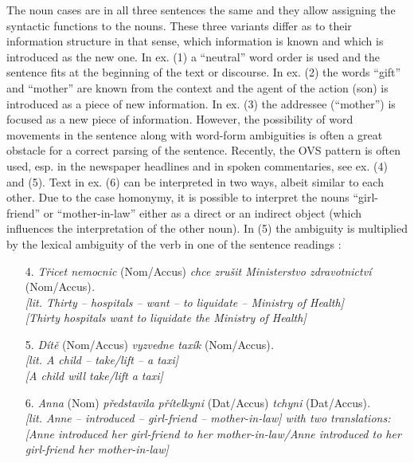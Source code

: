 \begin{multicols}{2}
The noun cases are in all three sentences the same and they allow assigning the syntactic functions to the nouns. These three variants differ as to their information structure in that sense, which information is known and which is introduced as the new one. In ex. (1) a “neutral” word order is used and the sentence fits at the beginning of the text or discourse. In ex. (2) the words “gift” and “mother” are known from the context and the agent of the action (son) is introduced as a piece of new information. In ex. (3) the addressee (“mother”) is focused as a new piece of information.
However, the possibility of word movements in the sentence along with word-form ambiguities is often a great obstacle for a correct parsing of the sentence. Recently, the OVS pattern is often used, esp. in the newspaper headlines and in spoken commentaries, see ex. (4) and (5). Text in ex. (6) can be interpreted in two ways, albeit similar to each other. Due to the case homonymy, it is possible to interpret the nouns “girl-friend” or “mother-in-law” either as a direct or an indirect object (which influences the interpretation of the other noun). In (5) the ambiguity is multiplied by the lexical ambiguity of the verb in one of the sentence readings \cite{Note4}:

\begin{enumerate}
\item[4.] \textit{Třicet nemocnic} (Nom/Accus) \textit{chce zrušit Ministerstvo zdravotnictví} (Nom/Accus)\textit{.}\\
  \textit{{[}lit. Thirty – hospitals – want – to liquidate – Ministry of Health{]}}\\
  \textit{{[}Thirty hospitals want to liquidate the Ministry of Health{]}}

\item[5.] \textit{Dítě} (Nom/Accus) \textit{vyzvedne taxík} (Nom/Accus)\textit{.}\\
  \textit{{[}lit. A child – take/lift – a taxi{]}}\\
  \textit{{[}A child will take/lift a taxi{]}}

\item[6.] \textit{Anna} (Nom) \textit{představila přítelkyni} (Dat/Accus) \textit{tchyni} (Dat/Accus)\textit{.}\\
  \textit{{[}lit. Anne – introduced --  girl-friend –  mother-in-law{]} with two translations:}\\
  \textit{{[}Anne introduced her girl-friend to her mother-in-law/Anne introduced to her girl-friend her mother-in-law{]}}
\end{enumerate}


\end{multicols}
